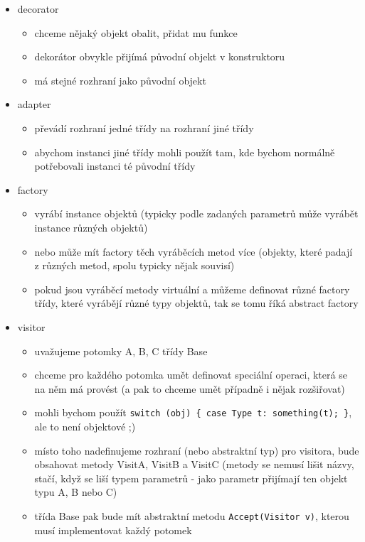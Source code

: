 \begin{itemize}
\begin{itemize}
\item decorator
\begin{itemize}
\item chceme nějaký objekt obalit, přidat mu funkce
\item dekorátor obvykle přijímá původní objekt v konstruktoru
\item má stejné rozhraní jako původní objekt
\end{itemize}
\item adapter
\begin{itemize}
\item převádí rozhraní jedné třídy na rozhraní jiné třídy
\item abychom instanci jiné třídy mohli použít tam, kde bychom normálně potřebovali instanci té původní třídy
\end{itemize}
\item factory
\begin{itemize}
\item vyrábí instance objektů (typicky podle zadaných parametrů může vyrábět instance různých objektů)
\item nebo může mít factory těch vyráběcích metod více (objekty, které padají z různých metod, spolu typicky nějak souvisí)
\item pokud jsou vyráběcí metody virtuální a můžeme definovat různé factory třídy, které vyrábějí různé typy objektů, tak se tomu říká abstract factory
\end{itemize}
\item visitor
\begin{itemize}
\item uvažujeme potomky A, B, C třídy Base
\item chceme pro každého potomka umět definovat speciální operaci, která se na něm má provést (a pak to chceme umět případně i nějak rozšiřovat)
\item mohli bychom použít \texttt{switch \allowbreak{}(\allowbreak{}obj)\allowbreak{} \allowbreak{}\{ \allowbreak{}case \allowbreak{}Type \allowbreak{}t: \allowbreak{}something(\allowbreak{}t)\allowbreak{};\allowbreak{} \allowbreak{}\}\allowbreak{}}, ale to není objektové ;)
\item místo toho nadefinujeme rozhraní (nebo abstraktní typ) pro visitora, bude obsahovat metody VisitA, VisitB a VisitC (metody se nemusí lišit názvy, stačí, když se liší typem parametrů - jako parametr přijímají ten objekt typu A, B nebo C)
\item třída Base pak bude mít abstraktní metodu \texttt{Accept(\allowbreak{}Visitor \allowbreak{}v)\allowbreak{}}, kterou musí implementovat každý potomek

\end{itemize}
\end{itemize}
\end{itemize}
